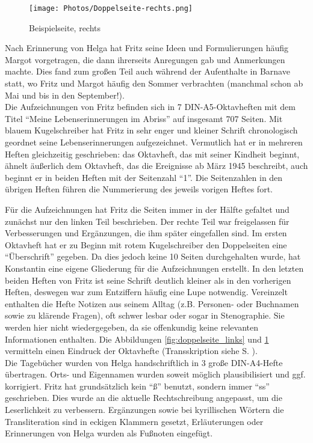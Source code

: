 \documentclass[a5paper,pagesize,10pt,twoside=true]{scrbook}
\begin{document}
\begin{figure}[p]
	\texttt{[image: Photos/Doppelseite-rechts.png]}
	\caption{Beispielseite, rechts}
	\label{fig:doppelseite_rechts}
\end{figure}

Nach Erinnerung von Helga hat Fritz seine Ideen und Formulierungen häufig Margot vorgetragen, die dann ihrerseits Anregungen gab und Anmerkungen machte. Dies fand zum großen Teil auch während der Aufenthalte in Barnave statt, wo Fritz und Margot häufig den Sommer verbrachten (manchmal schon ab Mai und bis in den September!).\\

Die Aufzeichnungen von Fritz befinden sich in 7 DIN-A5-Oktavheften mit dem Titel \enquote{Meine Lebenserinnerungen im Abriss} auf insgesamt 707 Seiten. Mit blauem Kugelschreiber hat Fritz in sehr enger und kleiner Schrift chronologisch geordnet seine Lebenserinnerungen aufgezeichnet. Vermutlich hat er in mehreren Heften gleichzeitig geschrieben: das Oktavheft, das mit seiner Kindheit beginnt, ähnelt äußerlich dem Oktavheft, das die Ereignisse ab März 1945 beschreibt, auch beginnt er in beiden Heften mit der Seitenzahl \enquote{1}. Die Seitenzahlen in den übrigen Heften führen die Nummerierung des jeweils vorigen Heftes fort.

Für die Aufzeichnungen hat Fritz die Seiten immer in der Hälfte gefaltet und zunächst nur den linken Teil beschrieben. Der rechte Teil war freigelassen für Verbesserungen und Ergänzungen, die ihm später eingefallen sind. Im ersten Oktavheft hat er zu Beginn mit rotem Kugelschreiber den Doppelseiten eine \enquote{Überschrift} gegeben. Da dies jedoch keine 10 Seiten durchgehalten wurde, hat Konstantin eine eigene Gliederung für die Aufzeichnungen erstellt. In den letzten beiden Heften von Fritz ist seine Schrift deutlich kleiner als in den vorherigen Heften, deswegen war zum Entziffern häufig eine Lupe notwendig. Vereinzelt enthalten die Hefte Notizen aus seinem Alltag (z.B. Personen- oder Buchnamen sowie zu klärende Fragen), oft schwer lesbar oder sogar in Stenographie. Sie werden hier nicht wiedergegeben, da sie offenkundig keine relevanten Informationen enthalten. Die Abbildungen \ref{fig:doppelseite_links} und \ref{fig:doppelseite_rechts} vermitteln einen Eindruck der Oktavhefte (Transskription siehe S. \pageref{para:kindheitserinnerungen}).\\

Die Tagebücher wurden von Helga handschriftlich in 3 große DIN-A4-Hefte übertragen. Orts- und Eigennamen wurden soweit möglich plausibilisiert und ggf. korrigiert. Fritz hat grundsätzlich kein \enquote{ß} benutzt, sondern immer \enquote{ss} geschrieben. Dies wurde an die aktuelle Rechtschreibung angepasst, um die Leserlichkeit zu verbessern. Ergänzungen sowie bei kyrillischen Wörtern die Transliteration sind in eckigen Klammern gesetzt, Erläuterungen oder Erinnerungen von Helga wurden als Fußnoten eingefügt.
\end{document}
